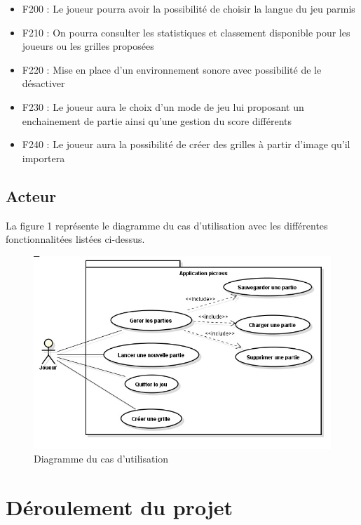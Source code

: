 \documentclass[11pt]{article}
\begin{document}
\begin{itemize}
	\item F200 : Le joueur pourra avoir la possibilité de choisir la langue du jeu parmis 
	\item F210 : On pourra consulter les statistiques et classement disponible pour les joueurs ou les grilles proposées
	\item F220 : Mise en place d'un environnement sonore avec possibilité de le désactiver
	\item F230 : Le joueur aura le choix d'un mode de jeu lui proposant un enchainement de partie ainsi qu'une gestion du score différents
	\item F240 : Le joueur aura la possibilité de créer des grilles à partir d'image qu'il importera
\end{itemize}

\newpage
\subsection{Acteur}
	    La figure 1 représente le diagramme du cas d'utilisation avec les différentes fonctionnalitées listées ci-dessus.
	\begin{figure}[!ht]
		\centering
		\includegraphics[]{./Diagrammes/UserCase.jpg}
		\caption{Diagramme du cas d'utilisation}
	\end{figure}

\newpage %

\section{Déroulement du projet}
\end{document}
